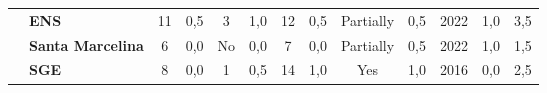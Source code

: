 \begin{table}
\begin{tabular}{c|p{2cm}|cc|cc|cc|cc|cc|c}
    {\cellcolor[rgb]{0.753,0.753,0.753}}                                            & {\cellcolor[rgb]{0.753,0.753,0.753}}\textbf{ENS}                                                   & 11                                                                        & 0,5                                                                       & 3                                                                         & 1,0                                                                      & 12                                                       & 0,5                                               & Partially                                          & 0,5                                               & 2022                                               & 1,0                                                                                                                                                 & 3,5 \\
    \rowcolor[rgb]{0.898,0.898,0.898} {\cellcolor[rgb]{0.753,0.753,0.753}}          & {\cellcolor[rgb]{0.753,0.753,0.753}}\textbf{Santa Marcelina}                                       & 6                                                                         & 0,0                                                                       & No                                                                        & 0,0                                                                      & 7                                                        & 0,0                                               & Partially                                          & 0,5                                               & 2022                                               & 1,0                                                                                                                                                 & 1,5 \\
    {\cellcolor[rgb]{0.753,0.753,0.753}}                                            & {\cellcolor[rgb]{0.753,0.753,0.753}}\textbf{SGE}                                                   & 8                                                                         & 0,0                                                                       & 1                                                                         & 0,5                                                                      & 14                                                       & 1,0                                               & Yes                                                & 1,0                                               & 2016                                               & 0,0                                                                                                                                                 & 2,5 \\

\end{tabular}
\end{table}
